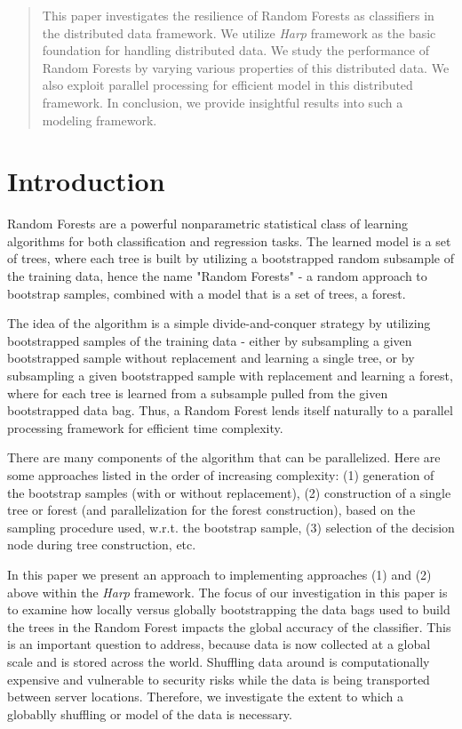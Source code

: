 \documentclass{sig-alternate-05-2015}
\begin{document}
\maketitle
\begin{abstract}
This paper investigates the resilience of Random Forests as classifiers in the distributed data framework. We utilize \textit{Harp} framework as the basic foundation for handling distributed data. We study the performance of Random Forests by varying various properties of this distributed data. We also exploit parallel processing for efficient model in this distributed framework. In conclusion, we provide insightful results into such a modeling framework.
\end{abstract}


\section{Introduction}
Random Forests \cite{Breiman2001} are a powerful nonparametric statistical class of learning algorithms for both classification and regression tasks. The learned model is a set of trees, where each tree is built by utilizing a bootstrapped random subsample of the training data, hence the name "Random Forests" - a random approach to bootstrap samples, combined with a model that is a set of trees, a forest.

The idea of the algorithm is a simple divide-and-conquer strategy by utilizing bootstrapped samples of the training data - either by subsampling a given bootstrapped sample without replacement and learning a single tree, or by subsampling a given bootstrapped sample with replacement and learning a forest, where for each tree is learned from a subsample pulled from the given bootstrapped data bag. Thus, a Random Forest lends itself naturally to a parallel processing framework for efficient time complexity.

There are many components of the algorithm that can be parallelized. Here are some approaches listed in the order of increasing complexity: (1) generation of the bootstrap samples (with or without replacement), (2) construction of a single tree or forest (and parallelization for the forest construction), based on the sampling procedure used, w.r.t. the bootstrap sample, (3) selection of the decision node during tree construction, etc.

In this paper we present an approach to implementing approaches (1) and (2) above within the \textit{Harp} framework. The focus of our investigation in this paper is to examine how locally versus globally bootstrapping the data bags used to build the trees in the Random Forest impacts the global accuracy of the classifier. This is an important question to address, because data is now collected at a global scale and is stored across the world. Shuffling data around is computationally expensive and vulnerable to security risks while the data is being transported between server locations. Therefore, we investigate the extent to which a globablly shuffling  or model of the data is necessary.
\end{document}

